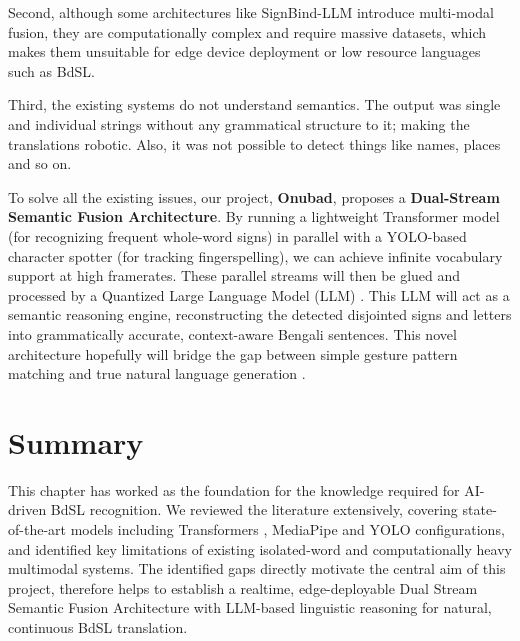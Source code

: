     Second, although some architectures like SignBind-LLM \cite{wang_signbind_llm_2025} introduce multi-modal fusion, they are computationally complex and require massive datasets, which makes them unsuitable for edge device deployment or low resource languages such as BdSL.
 

    Third, the existing systems do not understand semantics. The output was single and individual strings without any grammatical structure to it; making the translations robotic. Also, it was not possible to detect things like names, places and so on.

    To solve all the existing issues, our project, \textbf{Onubad}, proposes a \textbf{Dual-Stream Semantic Fusion Architecture}. By running a lightweight Transformer model \cite{transformer_seq} (for recognizing frequent whole-word signs) in parallel with a YOLO-based character spotter (for tracking fingerspelling), we can achieve infinite vocabulary support at high framerates. These parallel streams will then be glued and processed by a Quantized Large Language Model (LLM) \cite{llm_reasoning_review}. This LLM will act as a semantic reasoning engine, reconstructing the detected disjointed signs and letters into grammatically accurate, context-aware Bengali sentences. This novel architecture hopefully will bridge the gap between simple gesture pattern matching and true natural language generation \cite{llm_reasoning_review}.

\section{Summary}
This chapter has worked as the foundation for the knowledge required for AI-driven BdSL recognition. We reviewed the literature extensively, covering state-of-the-art models including Transformers \cite{transformer_seq}, MediaPipe \cite{mediapipe_framework} and YOLO \cite{yolo_nano_ref}configurations, and identified key limitations of existing isolated-word and computationally heavy multimodal systems. The identified gaps directly motivate the central aim of this project, therefore helps to establish a realtime, edge-deployable Dual Stream Semantic Fusion Architecture with LLM-based linguistic reasoning for natural, continuous BdSL translation.